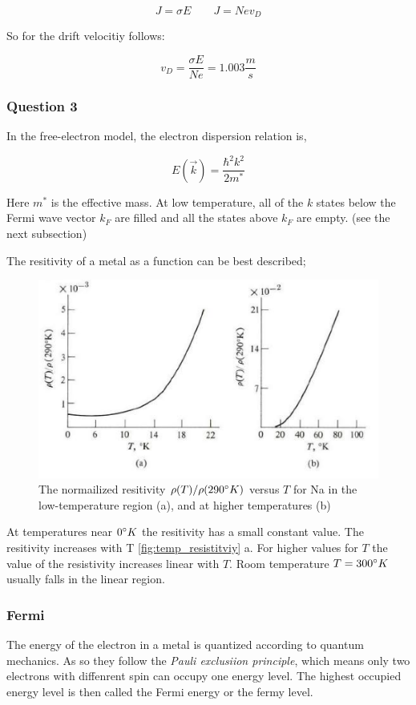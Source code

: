 $$J = \sigma E \qquad J = Nev_D$$

So for the drift velocitiy follows:

$$v_D =  \frac{\sigma E}{N e} = 1.003 \frac{m}{s}$$

\subsubsection*{Question 3}

In the free-electron model, the electron dispersion relation is,

$$E(\vec{k}) = \frac{\hbar^2k^2}{2m^*}$$

Here $m^*$ is the effective mass. At low temperature, all of
the $k$ states below the Fermi wave vector $k_F$ are filled 
and all the states above $k_F$ are empty.
(see the next subsection)


The resitivity of a metal as a function can be best described;

\begin{figure}[H]
    \centering
    \includegraphics[width=0.6\linewidth]{Graphics/Chapter1/temp_resistitviy.png}
    \caption{The normailized resitivity $\rho(T)/\rho(290\degree K)$ versus $T$ 
    for Na in the low-temperature region (a), and at higher temperatures (b) 
    \cite[Elementary Solid State Physics p. 148]{elementary_SSP} }
    \label{fig:temp_resistitviy}
\end{figure}

At temperatures near $0 \degree K$ the resitivity has a small constant 
value. The resitivity increases with T \autoref{fig:temp_resistitviy} a.
For higher values for $T$ the value of the resistivity
increases linear with $T$. Room temperature $T=300\degree K$
usually falls in the linear region.

\subsubsection*{Fermi}

The energy of the electron in a metal is quantized according to quantum mechanics.
As so they follow the \textit{Pauli exclusiion principle}, which means only two 
electrons with diffenrent spin can occupy one energy level.
The highest occupied energy level is then called the Fermi energy or the fermy
level.


